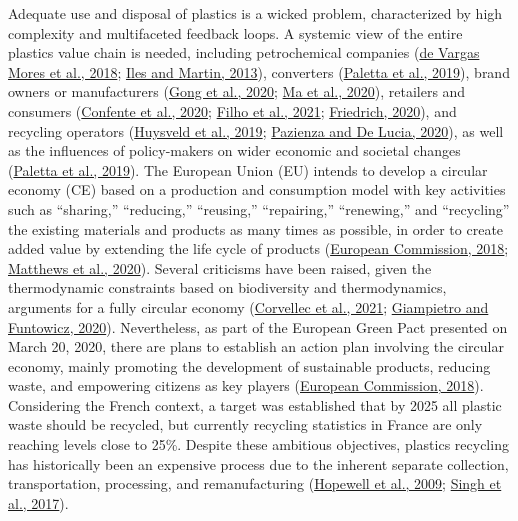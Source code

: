 \documentclass[12pt]{elsarticle} %
\begin{document}
Adequate use and disposal of plastics is a wicked problem, characterized by high complexity and multifaceted feedback loops.
A systemic view of the entire plastics value chain is needed, including petrochemical companies (\protect\hyperlink{ref-DeVargasMores2018}{de Vargas Mores et al., 2018}; \protect\hyperlink{ref-Iles2013}{Iles and Martin, 2013}), converters (\protect\hyperlink{ref-Paletta2019}{Paletta et al., 2019}), brand owners or manufacturers (\protect\hyperlink{ref-Gong2020}{Gong et al., 2020}; \protect\hyperlink{ref-Ma2020}{Ma et al., 2020}), retailers and consumers (\protect\hyperlink{ref-Confente2020}{Confente et al., 2020}; \protect\hyperlink{ref-Filho2021}{Filho et al., 2021}; \protect\hyperlink{ref-Friedrich2020}{Friedrich, 2020}), and recycling operators (\protect\hyperlink{ref-Huysveld2019}{Huysveld et al., 2019}; \protect\hyperlink{ref-Pazienza2020}{Pazienza and De Lucia, 2020}), as well as the influences of policy-makers on wider economic and societal changes (\protect\hyperlink{ref-Paletta2019}{Paletta et al., 2019}).
The European Union (EU) intends to develop a circular economy (CE) based on a production and consumption model with key activities such as ``sharing,'' ``reducing,'' ``reusing,'' ``repairing,'' ``renewing,'' and ``recycling'' the existing materials and products as many times as possible, in order to create added value by extending the life cycle of products (\protect\hyperlink{ref-EC2018}{European Commission, 2018}; \protect\hyperlink{ref-matthews2020}{Matthews et al., 2020}).
Several criticisms have been raised, given the thermodynamic constraints based on biodiversity and thermodynamics, arguments for a fully circular economy (\protect\hyperlink{ref-corvellec2021}{Corvellec et al., 2021}; \protect\hyperlink{ref-Giampietro2020}{Giampietro and Funtowicz, 2020}).
Nevertheless, as part of the European Green Pact presented on March 20, 2020, there are plans to establish an action plan involving the circular economy, mainly promoting the development of sustainable products, reducing waste, and empowering citizens as key players (\protect\hyperlink{ref-EC2018}{European Commission, 2018}).
Considering the French context, a target was established that by 2025 all plastic waste should be recycled, but currently recycling statistics in
France are only reaching levels close to 25\%.
Despite these ambitious objectives, plastics recycling has historically been an expensive process due to the inherent separate collection, transportation, processing, and remanufacturing (\protect\hyperlink{ref-Hopewell2009}{Hopewell et al., 2009}; \protect\hyperlink{ref-Singh2017b}{Singh et al., 2017}).
\end{document}
